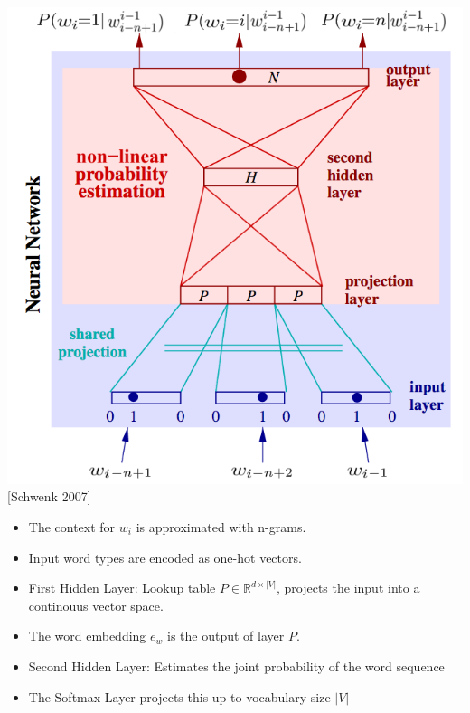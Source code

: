 \documentclass[11pt, a4paper, landscape]{article}
\begin{document}
\vfill
\begin{minipage}[c]{.5\linewidth}
    \includegraphics[width=\linewidth]{../article/img/classic_nnlm}\\
    {[}Schwenk 2007{]}
\end{minipage}
\begin{minipage}[c]{.5\linewidth}
\begin{itemize}
\item The context for $w_i$ is approximated with n-grams.
\item Input word types are encoded as one-hot vectors.
\item First Hidden Layer: Lookup table $P \in \mathbb{R}^{d \times |V|}$, projects the input into a continouus vector space.
\item The word embedding $e_w$ is the output of layer $P$.
\item Second Hidden Layer: Estimates the joint probability of the word sequence
\item The Softmax-Layer projects this up to vocabulary size $|V|$
\end{itemize}
\end{minipage}
\vfill

\NewPage{}
\end{document}
